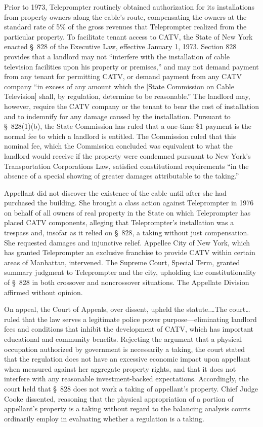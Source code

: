 Prior to 1973, Teleprompter routinely obtained authorization for its
installations from property owners along the cable's route, compensating the
owners at the standard rate of 5\% of the gross revenues that Teleprompter
realized from the particular property. To facilitate tenant access to CATV, the
State of New York enacted \S~828 of the Executive Law, effective January 1,
1973. Section 828 provides that a landlord may not ``interfere with the
installation of cable television facilities upon his property or premises,'' and
may not demand payment from any tenant for permitting CATV, or demand payment
from any CATV company ``in excess of any amount which the [State Commission on
Cable Television] shall, by regulation, determine to be reasonable.'' The
landlord may, however, require the CATV company or the tenant to bear the cost
of installation and to indemnify for any damage caused by the installation.
Pursuant to \S~828(1)(b), the State Commission has ruled that a one-time \$1
payment is the normal fee to which a landlord is entitled. The Commission ruled
that this nominal fee, which the Commission concluded was equivalent to what the
landlord would receive if the property were condemned pursuant to New York's
Transportation Corporations Law, satisfied constitutional requirements ``in the
absence of a special showing of greater damages attributable to the taking.''

Appellant did not discover the existence of the cable until after she had
purchased the building. She brought a class action against Teleprompter in 1976
on behalf of all owners of real property in the State on which Teleprompter has
placed CATV components, alleging that Teleprompter's installation was a trespass
and, insofar as it relied on \S~828, a taking without just compensation. She
requested damages and injunctive relief. Appellee City of New York, which has
granted Teleprompter an exclusive franchise to provide CATV within certain areas
of Manhattan, intervened. The Supreme Court, Special Term, granted summary
judgment to Teleprompter and the city, upholding the constitutionality of \S~828
in both crossover and noncrossover situations. The Appellate Division affirmed
without opinion. 

On appeal, the Court of Appeals, over dissent, upheld the statute.\ldots The
court\ldots ruled that the law serves a legitimate police power
purpose---eliminating landlord fees and conditions that inhibit the development
of CATV, which has important educational and community benefits. Rejecting the
argument that a physical occupation authorized by government is necessarily a
taking, the court stated that the regulation does not have an excessive economic
impact upon appellant when measured against her aggregate property rights, and
that it does not interfere with any reasonable investment-backed expectations.
Accordingly, the court held that \S~828 does not work a taking of appellant's
property. Chief Judge Cooke dissented, reasoning that the physical appropriation
of a portion of appellant's property is a taking without regard to the balancing
analysis courts ordinarily employ in evaluating whether a regulation is a
taking.

